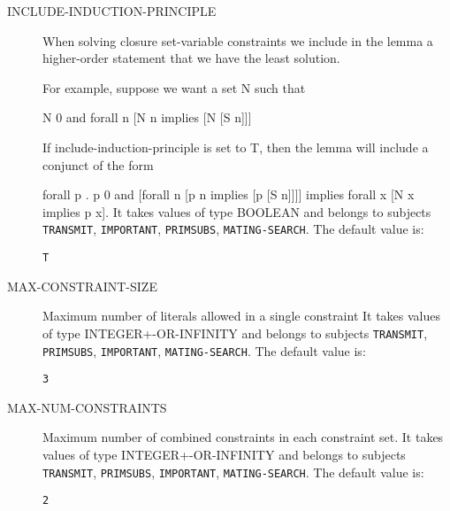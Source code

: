 \begin{description}
\item[INCLUDE-INDUCTION-PRINCIPLE]  
When solving closure set-variable constraints we
include in the lemma a higher-order statement that we have
the least solution.

For example, suppose we want a set N such that

N 0
and
forall n [N n implies [N [S n]]]

If include-induction-principle is set to T, then the lemma
will include a conjunct of the form

forall p . p 0 and [forall n [p n implies [p [S n]]]]
       implies forall x [N x implies p x].
It takes values of type BOOLEAN and belongs to subjects \texttt{TRANSMIT}, \texttt{IMPORTANT}, \texttt{PRIMSUBS}, \texttt{MATING-SEARCH}.  The default value is: \begin{lstlisting}
T
\end{lstlisting}

\item[MAX-CONSTRAINT-SIZE]  
Maximum number of literals allowed in a single constraint
It takes values of type INTEGER+-OR-INFINITY and belongs to subjects \texttt{TRANSMIT}, \texttt{PRIMSUBS}, \texttt{IMPORTANT}, \texttt{MATING-SEARCH}.  The default value is: \begin{lstlisting}
3
\end{lstlisting}

\item[MAX-NUM-CONSTRAINTS]  
Maximum number of combined constraints in each constraint set.
It takes values of type INTEGER+-OR-INFINITY and belongs to subjects \texttt{TRANSMIT}, \texttt{PRIMSUBS}, \texttt{IMPORTANT}, \texttt{MATING-SEARCH}.  The default value is: \begin{lstlisting}
2
\end{lstlisting}


\end{description}
